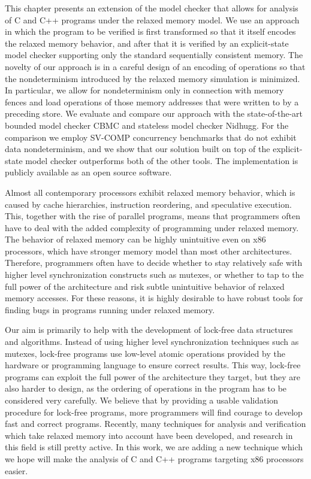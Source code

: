 
This chapter presents an extension of the \divine model checker that allows for
analysis of C and C++ programs under the \xtso relaxed memory model.
We use an approach in which the program to be verified is first transformed so
that it itself encodes the relaxed memory behavior, and after that it is
verified by an explicit-state model checker supporting only the standard
sequentially consistent memory.
The novelty of our approach is in a careful design of an encoding of \xtso
operations so that the nondeterminism introduced by the relaxed memory
simulation is minimized.
In particular, we allow for nondeterminism only in connection with memory
fences and load operations of those memory addresses that were written to by a
preceding store.
We evaluate and compare our approach with the state-of-the-art bounded model
checker CBMC and stateless model checker Nidhugg.
For the comparison we employ SV-COMP concurrency benchmarks that do not exhibit
data nondeterminism, and we show that our solution built on top of the
explicit-state model checker outperforms both of the other tools.
The implementation is publicly available as an open source software.

Almost all contemporary processors exhibit relaxed memory behavior, which is
caused by cache hierarchies, instruction reordering, and speculative execution.
This, together with the rise of parallel programs, means that programmers often have to deal with the added complexity of programming under relaxed memory.
The behavior of relaxed memory can be highly unintuitive even on x86 processors, which have stronger memory model than most other architectures.
Therefore, programmers often have to decide whether to stay relatively safe with
higher level synchronization constructs such as mutexes, or whether to tap to the full power of the architecture and risk subtle unintuitive behavior of relaxed memory accesses.
For these reasons, it is highly desirable to have robust tools for finding bugs in programs running under relaxed memory.

Our aim is primarily to help with the development of lock-free data structures and algorithms.
Instead of using higher level synchronization techniques such as mutexes, lock-free programs use low-level atomic operations provided by the hardware or programming language to ensure correct results.
This way, lock-free programs can exploit the full power of the architecture they target, but they are also harder to design, as the ordering of operations in the program has to be considered very carefully.
We believe that by providing a usable validation procedure for lock-free
programs, more programmers will find courage to develop fast and correct programs.
Recently, many techniques for analysis and verification which take relaxed memory into account have been developed, and research in this field is still pretty active.
In this work, we are adding a new technique which we hope will make the analysis of C and C++ programs targeting x86 processors easier.

